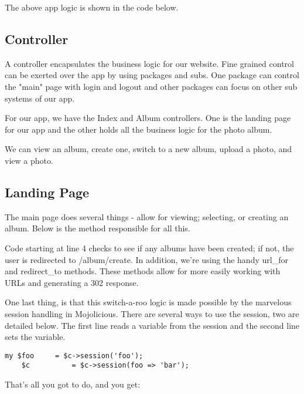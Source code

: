 \documentclass[14pt]{extreport}
\begin{document}
The above app logic is shown in the code below.



\subsection{Controller}

A controller encapsulates the business logic for our website.  Fine grained
control can be exerted over the app by using packages and subs.  One package
can control the "main" page with login and logout and other packages can focus
on other sub systems of our app.

For our app, we have the Index and Album controllers.  One is the landing page for
our app and the other holds all the business logic for the photo album.

We can view an album, create one, switch to a new album, upload a photo, and
view a photo.

\subsection{Landing Page}

The main page does several things - allow for viewing; selecting, or creating
an album.  Below is the method responsible for all this.



Code starting at line 4 checks to see if any albums have been created; if not,
the user is redirected to /album/create.  In addition, we're using the handy
url\_for and redirect\_to methods. These methods allow for more easily working
with URLs and generating a 302 response.

One last thing, is that this switch-a-roo logic is made possible by the
marvelous session handling in Mojolicious.  There are several ways to use the
session, two are detailed below.  The first line reads a variable from the
session and the second line sets the variable.

\begin{lstlisting}[style=BlockStyle]
    my $foo     = $c->session('foo');
    $c          = $c->session(foo => 'bar');
\end{lstlisting}

That's all you got to do, and you get:
\end{document}
